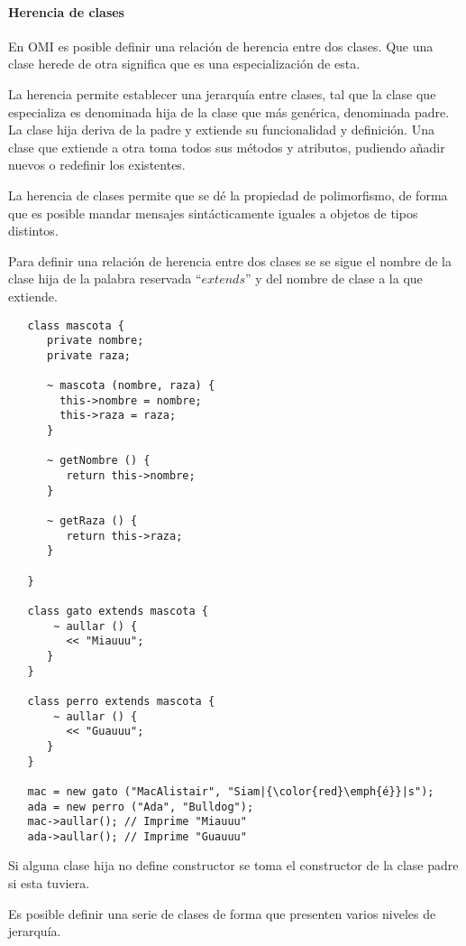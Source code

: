 \paragraph{Herencia de clases}


En OMI es posible definir una relación de herencia entre dos clases. Que una clase herede de otra significa 
que es una especialización de esta.  

La herencia permite establecer una jerarquía entre clases, tal que la clase que especializa es denominada 
hija de la clase que más genérica, denominada padre. La clase hija deriva de la padre y extiende su funcionalidad y definición.
Una clase que extiende a otra toma todos sus métodos y atributos, pudiendo añadir nuevos o redefinir los existentes.

La herencia de clases permite que se dé la propiedad de polimorfismo, de forma que 
es posible mandar mensajes sintácticamente iguales a objetos de tipos distintos.

Para definir una relación de herencia entre dos clases se se sigue el nombre de la clase hija de la palabra 
reservada ``$extends$'' y del nombre de clase a la que extiende. \\



\begin{lstlisting}
   class mascota {
      private nombre; 
      private raza;
      
      ~ mascota (nombre, raza) { 
        this->nombre = nombre; 
        this->raza = raza;
      }
      
      ~ getNombre () {
         return this->nombre;
      }
      
      ~ getRaza () {
         return this->raza;
      }
      
   }

   class gato extends mascota {
       ~ aullar () { 
         << "Miauuu";
      }
   }

   class perro extends mascota {
       ~ aullar () { 
         << "Guauuu";
      }
   }
   
   mac = new gato ("MacAlistair", "Siam|{\color{red}\emph{é}}|s"); 
   ada = new perro ("Ada", "Bulldog");  
   mac->aullar(); // Imprime "Miauuu"
   ada->aullar(); // Imprime "Guauuu"
\end{lstlisting}

Si alguna clase hija no define constructor se toma el constructor de la clase padre si esta tuviera. 

Es posible definir una serie de clases de forma que presenten varios niveles de jerarquía.



